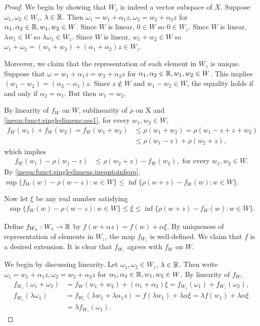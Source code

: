 \begin{proof}
We begin by showing that $W_z$ is indeed a vector subspace of $X$.
Suppose $\omega_1, \omega_2 \in W_z$, $\lambda \in {\mathbb R}$. Then $\omega_1 = w_1 + \alpha_1 z, \omega_2 = w_2 + \alpha_2 z$ for $\alpha_1, \alpha_2 \in {\mathbb R}, w_1, w_2 \in W$.
Since $W$ is linear, $0 \in W$ so $0 \in W_z$. Since $W$ is linear, $\lambda w_1 \in W$ so $\lambda \omega_1 \in W_z$. Since $W$ is linear, $w_1 + w_2 \in W$ so $\omega_1 + \omega_2 = (w_1 + w_2) + (\alpha_1 + \alpha_2) z \in W_z$.

Moreover, we claim that the representation of each element in $W_z$ is unique.
Suppose that $\omega = w_1 + \alpha_1 z = w_2 + \alpha_2 z$ for $\alpha_1, \alpha_2 \in {\mathbb R}, w_1, w_2 \in W$. This implies $(w_1 - w_2) = (\alpha_2 - \alpha_1) z$. Since $z \not \in W$ and $w_1 - w_2 \in W$, the equality holds if and only if $\alpha_2 = \alpha_1$. But then $w_1 = w_2$.

By linearity of $f_W$ on $W$, sublinearity of $\rho$ on X and \ref{ineqn:funct:singledimens:ass1}, for every $w_1, w_2 \in W$,
\begin{align*}
   f_W(w_1) + f_W(w_2) = f_W(w_1 + w_2) &\leq \rho (w_1 + w_2) = \rho(w_1 - z + z + w_2) \\
                                        &\leq \rho(w_1 - z) + \rho(w_2 + z),
\end{align*} which implies
\begin{align}
    \label{ineqn:funct:singledimens:ineqntoinfsup}
    f_W(w_1) - \rho(w_1 - z) &\leq  \rho(w_2 + z) - f_W(w_2), \text{ for every $w_1, w_2 \in W$.}
\end{align}
By \ref{ineqn:funct:singledimens:ineqntoinfsup}, $\sup \{ f_W(w) - \rho(w - z) : w \in W \} \leq \inf \{ \rho(w + z) - f_W(w) : w \in W \}$.

Now let $\xi$ be any real number satisfying
\begin{align}
    \label{ineqn:funct:singledimens:ineqen_infsup}
    \sup \{ f_W(w) - \rho(w - z) : w \in W \} \leq \xi \leq \inf \{ \rho(w + z) - f_W(w) : w \in W \}.
\end{align}

Define $f_{W_{z}} : W_{z} \to {\mathbb R}$ by $f(w + \alpha z) = f(w) + \alpha \xi$. By uniqueness of representation of elements in $W_{z}$, the map $f_{W_{z}} $ is well-defined. We claim that $f$ is a desired extension. It is clear that $f_{W_{z}}$ agrees with $f_W$ on $W$.

We begin by discussing linearity.
Let $\omega_1, \omega_2 \in W_z$, $\lambda \in {\mathbb R}$. Then write $\omega_1 = w_1 + \alpha_1 z, \omega_2 = w_2 + \alpha_2 z$ for $\alpha_1, \alpha_2 \in {\mathbb R}, w_1, w_2 \in W$.
By linearity of $f_W$, \begin{align*}
    f_{W_{z}}(\omega_1 + \omega_2) &= f_{W} (w_1 + w_2) + (\alpha_1 + \alpha_2)\xi =  f_{W_{z}}(\omega_1) + f_{W_{z}}(\omega_2), \\
    f_{W_{z}}(\lambda \omega_1) &=  f_{W_{z}} (\lambda w_1 + \lambda \alpha_1 z) = f(\lambda w_1) + \lambda \alpha \xi = \lambda f(w_1) + \lambda \alpha \xi \\
                                &= \lambda f_{W_{z}} (\omega_1).
\end{align*}


\end{proof}
